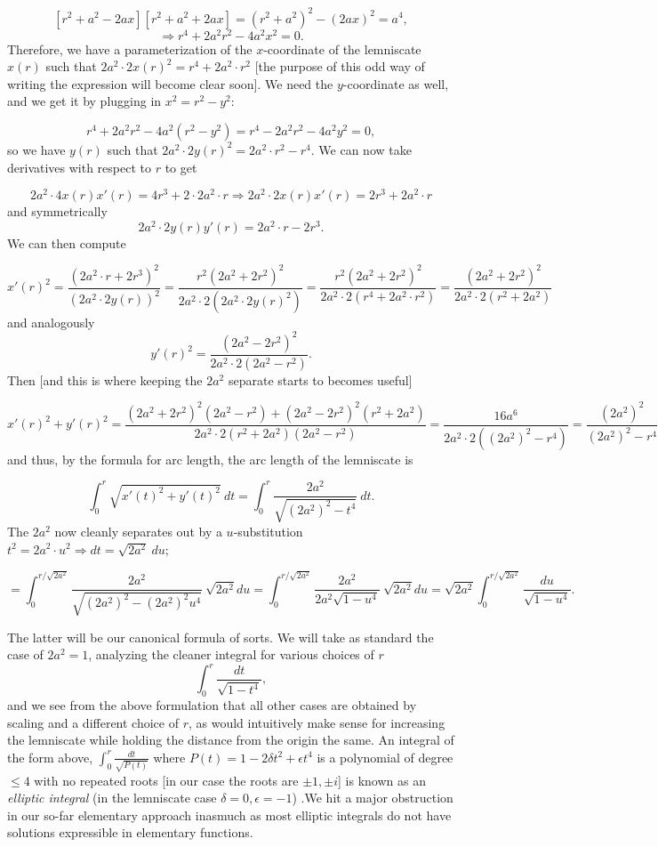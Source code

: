 \[[r^2 +a^2 - 2ax ][r^2+ a^2 + 2ax] = (r^2 + a^2)^2 - (2ax)^2   = a^4, \]
\[ \Rightarrow r^4 + 2 a^2 r^2 - 4 a^2 x^2 = 0.\]
Therefore, we have a parameterization of the $x$-coordinate of the lemniscate $x(r)$ such that $ 2 a^2 \cdot 2x(r)^2  = r^4 + 2 a^2  \cdot 
r^2$ [the purpose of this odd way of writing the expression will become clear soon]. We need the $y$-coordinate as well, and we get it by plugging in $x^2 = r^2 - y^2$:

\[ r^4 + 2 a^2 r^2 - 4 a^2 (r^2 - y^2) = r^4 - 2 a^2 r^2 - 4a^2 y^2 = 0   ,\]
so we have $y(r)$ such that $ 2a^2 \cdot 2y(r)^2 =  2a^2 \cdot r^2 - r^4$. We can now take derivatives with respect to $r$ to get

\[  2a^2 \cdot 4x(r) x'(r) = 4r^3 + 2 \cdot 2a^2 \cdot r \Rightarrow    2a^2 \cdot 2x(r) x'(r) = 2r^3 + 2 a^2 \cdot r\]
and symmetrically
\[ 2a^2 \cdot 2 y(r) y'(r) = 2a^2 \cdot r - 2r^3.\]
We can then compute

\[x'(r)^2 = \frac{(2a^2 \cdot r + 2 r^3)^2}{(2a^2 \cdot 2 y(r))^2} = \frac{r^2 (2a^2 + 2r^2)^2}{2a^2 \cdot 2 (2a^2 \cdot 2 y(r)^2)} =  \frac{r^2 (2a^2 + 2r^2)^2}{2a^2 \cdot 2 (r^4 + 2a^2 \cdot r^2) } = \frac{(2a^2 + 2r^2)^2}{2a^2 \cdot 2(r^2 + 2a^2) }\]
and analogously
\[y'(r)^2 =  \frac{(2a^2 - 2r^2)^2}{2a^2 \cdot 2(2a^2 - r^2) } .\]
Then [and this is where keeping the $2a^2$ separate starts to becomes useful]

\[ x'(r)^2 + y'(r)^2 = \frac{(2a^2 + 2r^2)^2  (2a^2 - r^2) +  (2a^2 - 2r^2)^2 (r^2 + 2a^2)} {2a^2 \cdot 2 (r^2 + 2a^2) (2a^2 - r^2)} =  \frac{16 a^6} {2a^2 \cdot 2 ((2a^2)^2 - r^4) }  =  \frac{(2a^2)^2} {(2a^2)^2 - r^4 } \]
and thus, by the formula for arc length, the arc length of the lemniscate is

\[\int_0^r \sqrt{x'(t)^2 + y'(t)^2}  \ dt = \int_0^r \frac{2a^2} { \sqrt{(2a^2)^2 - t^4 }}  \  dt .\]
The $2a^2$ now cleanly separates out by a $u$-substitution $t^2 = 2a^2 \cdot u^2 \Rightarrow dt = \sqrt{2a^2}    \ du;$

\[ = \int_0^{r / \sqrt{2a^2} }  \frac{2a^2} { \sqrt{(2a^2)^2 - (2a^2)^2 u^4}}  \  \sqrt{2a^2} du  = \int_0^{r / \sqrt{2a^2} }  \frac{2a^2} { 2a^2 \sqrt{1 -  u^4}}  \  \sqrt{2a^2} du  =  \sqrt{2a^2} \int_0^{r / \sqrt{2a^2} }  \frac{du} {\sqrt{1 -  u^4}}  .\]

The latter will be our canonical formula of sorts. We will take as standard the case of $2a^2 = 1$, analyzing the cleaner integral for various choices of $r$
\[\int_0^r \frac{dt}{\sqrt{1 - t^4}},\]
and we see from the above formulation that all other cases are obtained by scaling and a different choice of $r$, as would intuitively make sense for increasing the lemniscate while holding the distance from the origin the same. An integral of the form above, $\int_0^r \frac{dt}{\sqrt{P(t)}}$ where $P(t) = 1 - 2 \delta t^2 + \epsilon t^4 $ is a polynomial of degree $\leq 4$ with no repeated roots [in our case the roots are $\pm 1, \pm i$] is known as an \textit{elliptic integral} (in the lemniscate case $\delta = 0, \epsilon = -1$) .We hit a major obstruction in our so-far elementary approach inasmuch as most elliptic integrals do not have solutions expressible in elementary functions. 

